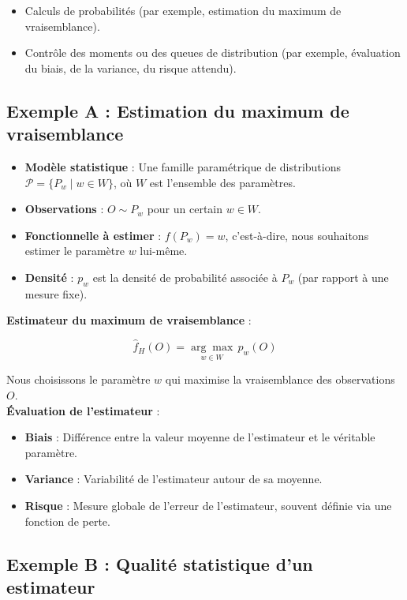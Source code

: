 \documentclass{article}
\begin{document}
\begin{itemize}
    \item Calculs de probabilités (par exemple, estimation du maximum de vraisemblance).
    \item Contrôle des moments ou des queues de distribution (par exemple, évaluation du biais, de la variance, du risque attendu).
\end{itemize}


\subsection{Exemple A : Estimation du maximum de vraisemblance}

\begin{itemize}
    \item \textbf{Modèle statistique} : Une famille paramétrique de distributions $\mathcal{P} = \{ P_w \mid w \in W \}$, où $W$ est l'ensemble des paramètres.
    \item \textbf{Observations} : $O \sim P_w$ pour un certain $w \in W$.
    \item \textbf{Fonctionnelle à estimer} : $f(P_w) = w$, c'est-à-dire, nous souhaitons estimer le paramètre $w$ lui-même.
    \item \textbf{Densité} : $p_w$ est la densité de probabilité associée à $P_w$ (par rapport à une mesure fixe).
\end{itemize}

\textbf{Estimateur du maximum de vraisemblance} :

\[
\hat{f}_H(O) = \underset{w \in W}{\arg\max} \, p_w(O)
\]

Nous choisissons le paramètre $w$ qui maximise la vraisemblance des observations $O$. \\

\textbf{Évaluation de l'estimateur} :

\begin{itemize}
    \item \textbf{Biais} : Différence entre la valeur moyenne de l'estimateur et le véritable paramètre.
    \item \textbf{Variance} : Variabilité de l'estimateur autour de sa moyenne.
    \item \textbf{Risque} : Mesure globale de l'erreur de l'estimateur, souvent définie via une fonction de perte.
\end{itemize}

\subsection{Exemple B : Qualité statistique d'un estimateur}
\end{document}
